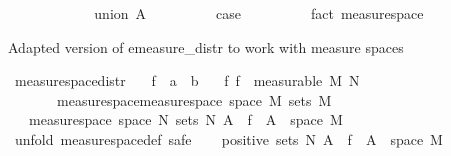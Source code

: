 \begin{isabellebody}
\ \ \ \ \isamarkupfalse%
\isanewline
\ \ \ \ \ \ \isamarkupfalse%
\ {\isacharparenleft}{\kern0pt}union\ A{\isacharparenright}{\kern0pt}\isanewline
\ \ \ \ \ \ \isamarkupfalse%
\ \isamarkupfalse%
\ {\isacharquery}{\kern0pt}case\ \isamarkupfalse%
\isanewline
\ \ \ \ \isamarkupfalse%
\isanewline
\ \ \isamarkupfalse%
\isanewline
{}\isamarkupfalse%
\ {\isacharparenleft}{\kern0pt}fact\ measure{\isacharunderscore}{\kern0pt}space{\isacharparenright}{\kern0pt}%
\endisatagproof
{\isafoldproof}%
%
\isadelimproof
%
\endisadelimproof
%
\begin{isamarkuptext}%
Adapted version of emeasure_distr to work with measure spaces%
\end{isamarkuptext}\isamarkuptrue%
\isamarkupfalse%
\ measure{\isacharunderscore}{\kern0pt}space{\isacharunderscore}{\kern0pt}distr{\isacharcolon}{\kern0pt}\isanewline
\ \ \ f\ {\isacharcolon}{\kern0pt}{\isacharcolon}{\kern0pt}\ {\isachardoublequoteopen}{\isacharprime}{\kern0pt}a\ {\isasymRightarrow}\ {\isacharprime}{\kern0pt}b{\isachardoublequoteclose}\isanewline
\ \ \ f{\isacharcolon}{\kern0pt}\ {\isachardoublequoteopen}f\ {\isasymin}\ measurable\ M\ N{\isachardoublequoteclose}\isanewline
\ \ \ \ \ \ \ measure{\isacharunderscore}{\kern0pt}space{\isacharcolon}{\kern0pt}{\isachardoublequoteopen}measure{\isacharunderscore}{\kern0pt}space\ {\isacharparenleft}{\kern0pt}space\ M{\isacharparenright}{\kern0pt}\ {\isacharparenleft}{\kern0pt}sets\ M{\isacharparenright}{\kern0pt}\ {\isasymmu}{\isachardoublequoteclose}\isanewline
\ \ \ {\isachardoublequoteopen}measure{\isacharunderscore}{\kern0pt}space\ {\isacharparenleft}{\kern0pt}space\ N{\isacharparenright}{\kern0pt}\ {\isacharparenleft}{\kern0pt}sets\ N{\isacharparenright}{\kern0pt}\ {\isacharparenleft}{\kern0pt}{\isasymlambda}A{\isachardot}{\kern0pt}\ {\isasymmu}\ {\isacharparenleft}{\kern0pt}f\ {\isacharminus}{\kern0pt}{\isacharbackquote}{\kern0pt}\ A\ {\isasyminter}\ space\ M{\isacharparenright}{\kern0pt}{\isacharparenright}{\kern0pt}{\isachardoublequoteclose}\isanewline
%
\isadelimproof
%
\endisadelimproof
%
\isatagproof
{}\isamarkupfalse%
\ {\isacharparenleft}{\kern0pt}unfold\ measure{\isacharunderscore}{\kern0pt}space{\isacharunderscore}{\kern0pt}def{\isacharcomma}{\kern0pt}\ safe{\isacharparenright}{\kern0pt}\isanewline
\ \ \isamarkupfalse%
\ {\isachardoublequoteopen}positive\ {\isacharparenleft}{\kern0pt}sets\ N{\isacharparenright}{\kern0pt}\ {\isacharparenleft}{\kern0pt}{\isasymlambda}A{\isachardot}{\kern0pt}\ {\isasymmu}\ {\isacharparenleft}{\kern0pt}f\ {\isacharminus}{\kern0pt}{\isacharbackquote}{\kern0pt}\ A\ {\isasyminter}\ space\ M{\isacharparenright}{\kern0pt}{\isacharparenright}{\kern0pt}{\isachardoublequoteclose}\isanewline

\end{isabellebody}
